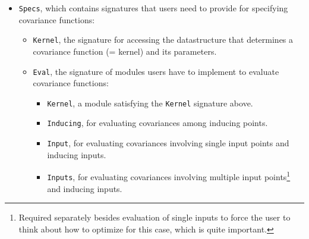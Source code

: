 \documentclass[10pt]{report}
\begin{document}
\begin{itemize}
\item \verb=Specs=, which contains signatures that users need to provide for
specifying covariance functions:
\begin{itemize}
\item \verb=Kernel=, the signature for accessing the datastructure that
determines a covariance function (= kernel) and its parameters.
\item \verb=Eval=, the signature of modules users have to implement to evaluate
covariance functions:

\begin{itemize}
\item \verb=Kernel=, a module satisfying the \verb=Kernel= signature above.
\item \verb=Inducing=, for evaluating covariances among inducing points.
\item \verb=Input=, for evaluating covariances involving single input points and
inducing inputs.
\item \verb=Inputs=, for evaluating covariances involving multiple input
points\footnote{Required separately besides evaluation of single inputs to force
the user to think about how to optimize for this case, which is quite
important.} and inducing inputs.
\end{itemize}


\end{itemize}
\end{itemize}
\end{document}
